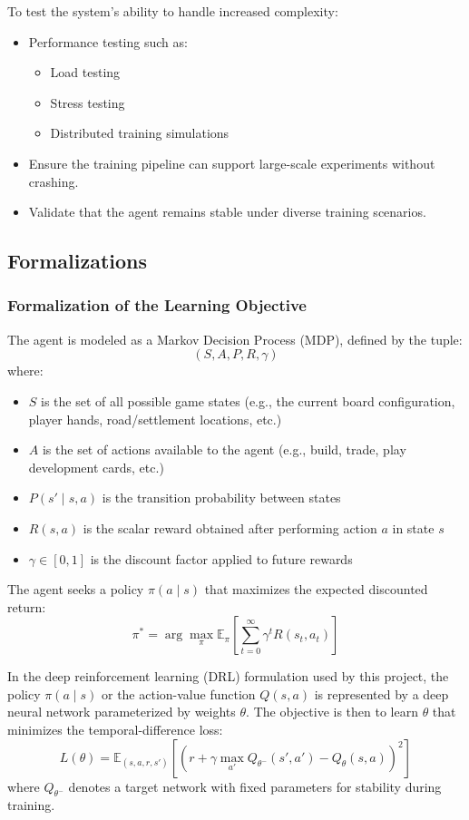 \documentclass{article}
\begin{document}
To test the system’s ability to handle increased complexity:
\begin{itemize}
    \item Performance testing such as:
    \begin{itemize}
        \item Load testing
        \item Stress testing
        \item Distributed training simulations
    \end{itemize}
    \item Ensure the training pipeline can support large-scale experiments without crashing.
    \item Validate that the agent remains stable under diverse training scenarios.
\end{itemize}

\subsection{Formalizations}
\subsubsection{Formalization of the Learning Objective}
\label{sec:formalization}

The \RL{} agent is modeled as a Markov Decision Process (MDP), defined by the tuple:
\[
(S, A, P, R, \gamma)
\]
where:
\begin{itemize}
    \item $S$ is the set of all possible game states (e.g., the current board configuration, player hands, road/settlement locations, etc.)
    \item $A$ is the set of actions available to the agent (e.g., build, trade, play development cards, etc.)
    \item $P(s' \mid s, a)$ is the transition probability between states
    \item $R(s, a)$ is the scalar reward obtained after performing action $a$ in state $s$
    \item $\gamma \in [0, 1]$ is the discount factor applied to future rewards
\end{itemize}

The agent seeks a policy $\pi(a \mid s)$ that maximizes the expected discounted return:
\[
\pi^* = \arg\max_{\pi} \mathbb{E}_{\pi}\left[\sum_{t=0}^{\infty} \gamma^t R(s_t, a_t)\right]
\]

In the deep reinforcement learning (DRL) formulation used by this project, the policy $\pi(a \mid s)$ or the action-value function $Q(s, a)$ is represented by a deep neural network parameterized by weights $\theta$. The objective is then to learn $\theta$ that minimizes the temporal-difference loss:
\[
L(\theta) = \mathbb{E}_{(s, a, r, s')} \left[ \left( r + \gamma \max_{a'} Q_{\theta^-}(s', a') - Q_{\theta}(s, a) \right)^2 \right]
\]
where $Q_{\theta^-}$ denotes a target network with fixed parameters for stability during training.
\end{document}
